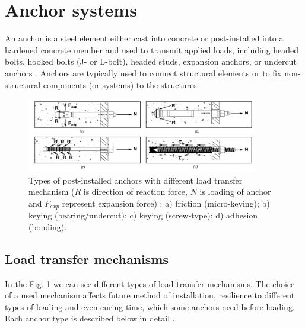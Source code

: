 
\thispagestyle{plain}
\section{Anchor systems}
An anchor is a steel element either cast into concrete or post-installed into a hardened concrete member and used to transmit applied loads, including headed bolts, hooked bolts (J- or L-bolt), headed studs, expansion anchors, or undercut anchors \cite{anchors-ACI-318M}. Anchors are typically used to connect structural elements or to fix non-structural components (or systems) to the structures. 

\begin{figure}[h!]
	\centering
	\includegraphics[width=0.9\textwidth]{obrazky/post_installed_anchor_types_repaired.png}
	\caption[Types of post-installed anchors with different load transfer mechanism]{Types of post-installed anchors with different load transfer mechanism ($R$ is direction of reaction force, $N$ is loading of anchor and $F_{exp}$ represent expansion force) \cite{hilti_anchors}: a) friction (micro-keying); b) keying (bearing/undercut); c) keying (screw-type); d) adhesion (bonding).}\label{obr:Post_installed_anchors}
\end{figure}

\subsection{Load transfer mechanisms}
In the Fig. \ref{obr:Post_installed_anchors} we can see different types of load transfer mechanisms. The choice of a  used mechanism affects future method of installation, resilience to different types of loading and even curing time, which some anchors need before loading. Each anchor type is described below in detail \cite{hilti_anchors}. 


